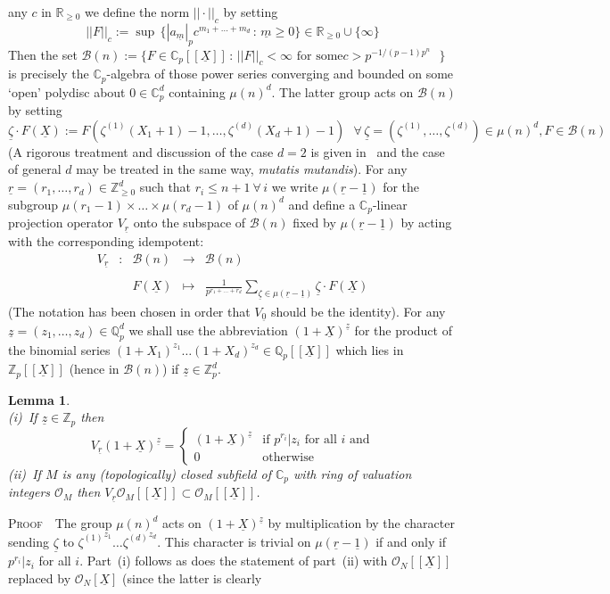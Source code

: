 \documentclass[12pt]{article}
\newtheorem{lemma}{Lemma}[section]
\newcounter{rem}[section]%
\newcommand{\bbC}{\ensuremath{\mathbb{C}}}
\newcommand{\bbQ}{\ensuremath{\mathbb{Q}}}
\newcommand{\bbR}{\ensuremath{\mathbb{R}}}
\newcommand{\bbZ}{\ensuremath{\mathbb{Z}}}
\newcommand{\bPf}{\noindent \textsc{Proof\ }}
\newcommand{\cB}{\ensuremath{\mathcal{B}}}
\newcommand{\cO}{\ensuremath{\mathcal{O}}}
\newcommand{\displaymapdef}[5]
{\[
\begin{array}{rcrcl}
 #1 &:& #2 &\longrightarrow& #3 \\
    & &    &                    \\
    & & #4 &\longmapsto    & #5
\end{array}
\]}
\newcommand{\rem}{\refstepcounter{rem}\noindent{\sc Remark \therem}}%
\renewcommand{\therem}{\thesection.\arabic{rem}}
\newcommand{\um}{\ensuremath{{\underline{m}}}}
\newcommand{\uo}{\ensuremath{{\underline{1}}}}
\newcommand{\ur}{\ensuremath{{\underline{r}}}}
\newcommand{\uX}{\ensuremath{{\underline{X}}}}
\newcommand{\uz}{\ensuremath{{\underline{z}}}}
\newcommand{\uzeta}{\ensuremath{{\underline{\zeta}}}}
\begin{document}
any $c$ in $\bbR_{\geq 0}$ we define the  norm $||\cdot||_c$ by setting
\[
||F||_c:=\sup\,\{|a_\um|_pc^{m_1+\ldots+m_d}\,:\,\um\geq 0\}
\in\bbR_{\geq 0}\cup\{\infty\}
\]
Then the set
$\cB(n):=\{F\in\bbC_p[[\uX]]\,:\,\mbox{$||F||_c<\infty$ for some
$c>p^{-1/(p-1)p^n}$ }\}$ is precisely the $\bbC_p$-algebra of those
power series converging and bounded on some `open' polydisc
about $0\in\bbC_p^d$ containing $\mu(n)^d$. The latter group acts on
$\cB(n)$ by setting
\[
\uzeta\cdot F(\uX):=F(\zeta^{(1)}(X_1+1)-1,\ldots,\zeta^{(d)}(X_d+1)-1)\ \ \
\forall\,\uzeta=(\zeta^{(1)},\ldots,\zeta^{(d)})\in\mu(n)^d, F\in\cB(n)
\]
(A rigorous
treatment and discussion of the case $d=2$ is given
in~\cite[Sec. 3.2]{p-adic lims} and the case of general $d$
may be treated in the same way, \emph{mutatis mutandis}). For any
$\ur=(r_1,\ldots,r_d)\in\bbZ_{\geq 0}^d$ such that
$r_i\leq n+1\ \forall\,i$ we write
$\mu(\ur-\uo)$ for the subgroup $\mu(r_1-1)\times\ldots\times\mu(r_d-1)$
of $\mu(n)^d$ and define a
$\bbC_p$-linear projection operator $V_\ur$ onto the subspace of $\cB(n)$ fixed by
$\mu(\ur-\uo)$ by acting with the corresponding idempotent:
\displaymapdef{V_\ur}{\cB(n)}{\cB(n)}{F(\uX)}
{\displaystyle\frac{1}{p^{r_1+\ldots+r_d}}\sum_{\uzeta\in
\mu(\ur-\uo)}\uzeta\cdot F(\uX)}
(The notation has been chosen in order that $V_{\underline{0}}$ should be the
identity).
For any $\uz=(z_1,\ldots,z_d)\in\bbQ_p^d$ we shall use the
abbreviation $(1+\uX)^{\uz}$ for the
product of the binomial series $(1+X_1)^{z_1}\ldots(1+X_d)^{z_d}\in \bbQ_p[[\uX]]$
which lies in $\bbZ_p[[\uX]]$ (hence in $\cB(n)$) if $\uz\in\bbZ_p^d$.
\begin{lemma}\label{lemma:3H}\ \vspace{1ex}\\
(i)~If $\uz\in\bbZ_p$ then
\[
V_\ur (1+\uX)^{\uz}=
\left\{
\begin{array}{ll}
(1+\uX)^{\uz}&
\mbox{if $p^{r_i}|z_i$ for all $i$ and}\\
0&
\mbox{otherwise}
\end{array}
\right.
\]
(ii)~If $M$ is any (topologically) closed subfield of $\bbC_p$ with
ring of valuation integers
$\cO_M$ then $V_\ur\cO_M[[\uX]]\subset\cO_M[[\uX]]$.
\end{lemma}
\bPf\ The group $\mu(n)^d$ acts on
$(1+\uX)^{\uz}$ by multiplication by the character sending
$\uzeta$ to ${\zeta^{(1)}}^{z_1}\ldots{\zeta^{(d)}}^{z_d}$. This character
is trivial on $\mu(\ur-\uo)$ if and only if $p^{r_i}|z_i$ for all $i$.
Part~(i) follows as does the statement of part~(ii) with $\cO_N[[\uX]]$
replaced by $\cO_N[\uX]$ (since the latter is clearly
\end{document}
